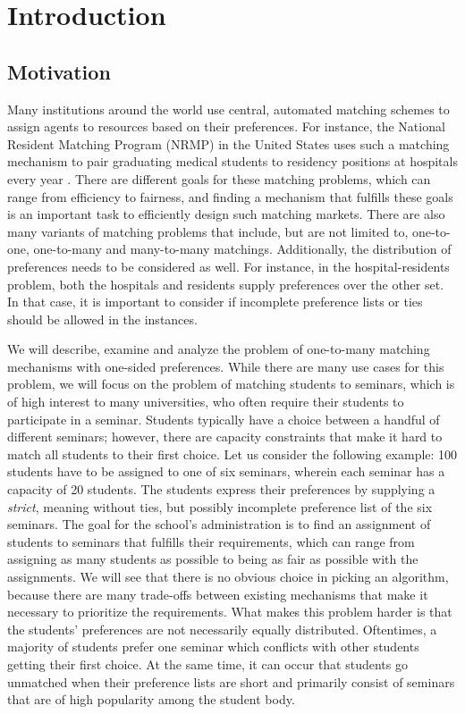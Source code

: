 \section{Introduction}
\label{sec:introduction}

\subsection{Motivation}
Many institutions around the world use central, automated matching schemes to assign agents to resources based on their preferences. For instance, the National Resident Matching Program (NRMP) in the United States uses such a matching mechanism to pair graduating medical students to residency positions at hospitals every year \cite{Roth-NRMP}. There are different goals for these matching problems, which can range from efficiency to fairness, and finding a mechanism that fulfills these goals is an important task to efficiently design such matching markets.
There are also many variants of matching problems that include, but are not limited to, one-to-one, one-to-many and many-to-many matchings. Additionally, the distribution of preferences needs to be considered as well. For instance, in the hospital-residents problem, both the hospitals and residents supply preferences over the other set. In that case, it is important to consider if incomplete preference lists or ties should be allowed in the instances. 

We will describe, examine and analyze the problem of one-to-many matching mechanisms with one-sided preferences. While there are many use cases for this problem, we will focus on the problem of matching students to seminars, which is of high interest to many universities, who often require their students to participate in a seminar. Students typically have a choice between a handful of different seminars; however, there are capacity constraints that make it hard to match all students to their first choice. Let us consider the following example: 100 students have to be assigned to one of six seminars, wherein each seminar has a capacity of 20 students. The students express their preferences by supplying a \emph{strict}, meaning without ties, but possibly incomplete preference list of the six seminars. The goal for the school's administration is to find an assignment of students to seminars that fulfills their requirements, which can range from assigning as many students as possible to being as fair as possible with the assignments. We will see that there is no obvious choice in picking an algorithm, because there are many trade-offs between existing mechanisms that make it necessary to prioritize the requirements.  
What makes this problem harder is that the students' preferences are not necessarily equally distributed. Oftentimes, a majority of students prefer one seminar which conflicts with other students getting their first choice. At the same time, it can occur that students go unmatched when their preference lists are short and primarily consist of seminars that are of high popularity among the student body.

